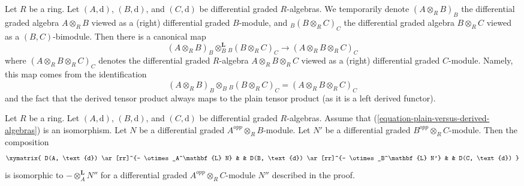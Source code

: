 \noindent
Let $R$ be a ring. Let $(A, \text{d})$, $(B, \text{d})$, and
$(C, \text{d})$ be differential graded $R$-algebras.
We temporarily denote $(A \otimes_R B)_B$ the differential
graded algebra $A \otimes_R B$ viewed as a (right) differential
graded $B$-module, and ${}_B(B \otimes_R C)_C$ the differential
graded algebra $B \otimes_R C$ viewed as a $(B, C)$-bimodule.
Then there is a canonical map
\begin{equation}
\label{equation-plain-versus-derived-algebras}
(A \otimes_R B)_B \otimes_B^\mathbf{L} {}_B(B \otimes_R C)_C
\longrightarrow
(A \otimes_R B \otimes_R C)_C
\end{equation}
where $(A \otimes_R B \otimes_R C)_C$ denotes the differential
graded $R$-algebra $A \otimes_R B \otimes_R C$ viewed as a
(right) differential graded $C$-module. Namely, this map
comes from the identification
$$
(A \otimes_R B)_B \otimes_B {}_B(B \otimes_R C)_C =
(A \otimes_R B \otimes_R C)_C
$$
and the fact that the derived tensor product always maps to the
plain tensor product (as it is a left derived functor).

\begin{lemma}
\label{lemma-compose-tensor-functors-general-algebra}
Let $R$ be a ring. Let $(A, \text{d})$, $(B, \text{d})$, and
$(C, \text{d})$ be differential graded $R$-algebras. Assume
that (\ref{equation-plain-versus-derived-algebras}) is an isomorphism.
Let $N$ be a differential graded $A^{opp} \otimes_R B$-module.
Let $N'$ be a differential graded $B^{opp} \otimes_R C$-module.
Then the composition
$$
\xymatrix{
D(A, \text{d}) \ar[rr]^{- \otimes_A^\mathbf{L} N} & &
D(B, \text{d}) \ar[rr]^{- \otimes_B^\mathbf{L} N'} & &
D(C, \text{d})
}
$$
is isomorphic to $- \otimes_A^\mathbf{L} N''$ for a differential graded
$A^{opp} \otimes_R C$-module $N''$ described in the proof.
\end{lemma}

